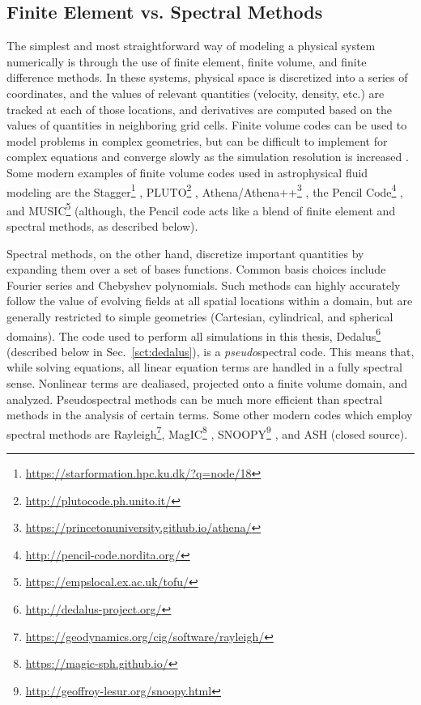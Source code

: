 \subsection{Finite Element vs. Spectral Methods}
The simplest and most straightforward way of modeling a physical system numerically is through the use of finite element, finite volume, and finite difference methods.
In these systems, physical space is discretized into a series of coordinates, and the values of relevant quantities (velocity, density, etc.) are tracked at each of those locations, and derivatives are computed based on the values of quantities in neighboring grid cells.
Finite volume codes can be used to model problems in complex geometries, but can be difficult to implement for complex equations and converge slowly as the simulation resolution is increased \citep{burns&all2019}.
Some modern examples of finite volume codes used in astrophysical fluid modeling are the Stagger\footnote{\url{https://starformation.hpc.ku.dk/?q=node/18}} \citep{galsgaard2011}, PLUTO\footnote{\url{http://plutocode.ph.unito.it/}} \citep{mignone&all2012}, Athena/Athena++\footnote{\url{https://princetonuniversity.github.io/athena/}} \citep{stone&all2008, stone&all2019}, the Pencil Code\footnote{\url{http://pencil-code.nordita.org/}} \citep{brandenburg&dobler2010}, and MUSIC\footnote{\url{https://empslocal.ex.ac.uk/tofu/}} \citep{goffrey&all2017} (although, the Pencil code acts like a blend of finite element and spectral methods, as described below).

Spectral methods, on the other hand, discretize important quantities by expanding them over a set of bases functions.
Common basis choices include Fourier series and Chebyshev polynomials.
Such methods can highly accurately follow the value of evolving fields at all spatial locations within a domain, but are generally restricted to simple geometries (Cartesian, cylindrical, and spherical domains).
The code used to perform all simulations in this thesis, Dedalus\footnote{\url{http://dedalus-project.org/}} (described below in Sec.~\ref{sct:dedalus}), is a \emph{pseudo}spectral code.
This means that, while solving equations, all linear equation terms are handled in a fully spectral sense.
Nonlinear terms are dealiased, projected onto a finite volume domain, and analyzed. 
Pseudospectral methods can be much more efficient than spectral methods in the analysis of certain terms.
Some other modern codes which employ spectral methods are Rayleigh\footnote{\url{https://geodynamics.org/cig/software/rayleigh/}}, MagIC\footnote{\url{https://magic-sph.github.io/}} \citep{wicht&all2017}, SNOOPY\footnote{\url{http://geoffroy-lesur.org/snoopy.html}} \citep{lesur2015}, and ASH (closed source).

